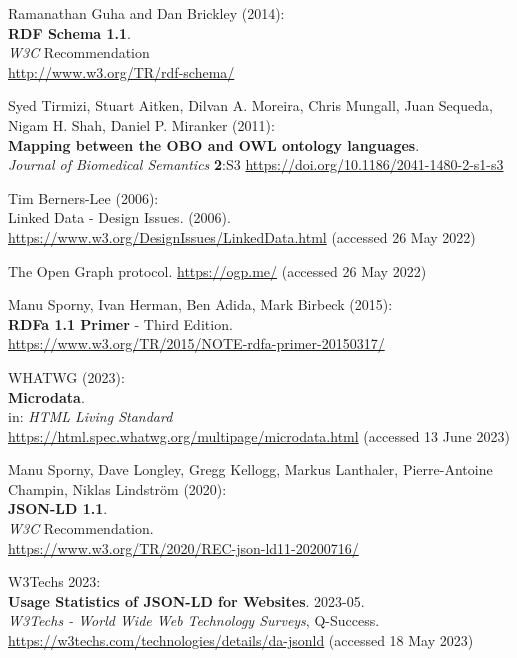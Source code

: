\begin{thebibliography}{9}
Ramanathan Guha and Dan Brickley (2014): \\
\textbf{RDF Schema 1.1}.\\
\emph{W3C} Recommendation \\
\url{http://www.w3.org/TR/rdf-schema/}

Syed Tirmizi, Stuart Aitken, Dilvan A. Moreira, Chris Mungall, Juan
Sequeda, Nigam H. Shah, Daniel P. Miranker (2011): \\
\textbf{Mapping between the {OBO} and {OWL} ontology languages}. \\
\emph{Journal of Biomedical Semantics} \textbf{2}:S3
\url{https://doi.org/10.1186/2041-1480-2-s1-s3}

Tim Berners-Lee (2006): \\
Linked {Data} - {Design Issues}. (2006).
\url{https://www.w3.org/DesignIssues/LinkedData.html} (accessed 26 May
2022)

The {Open Graph} protocol.  
\url{https://ogp.me/}
(accessed 26 May 2022)

Manu Sporny, Ivan Herman, Ben Adida, Mark Birbeck (2015):\\
\textbf{RDFa 1.1 Primer} - Third Edition. \\
\url{https://www.w3.org/TR/2015/NOTE-rdfa-primer-20150317/}

WHATWG (2023): \\
\textbf{Microdata}. \\
in: \emph{{HTML Living Standard}}
\url{https://html.spec.whatwg.org/multipage/microdata.html} (accessed 13
June 2023)

Manu Sporny, Dave Longley, Gregg Kellogg, Markus Lanthaler,
Pierre-Antoine Champin, Niklas Lindström (2020): \\
\textbf{JSON-LD 1.1}.\\
\emph{W3C} Recommendation.\\
\url{https://www.w3.org/TR/2020/REC-json-ld11-20200716/}

W3Techs 2023: \\
\textbf{Usage Statistics of JSON-LD for Websites}. 2023-05. \\
\emph{W3Techs - World Wide Web Technology Surveys}, Q-Success.
\url{https://w3techs.com/technologies/details/da-jsonld} (accessed 18
May 2023)


\end{thebibliography}
